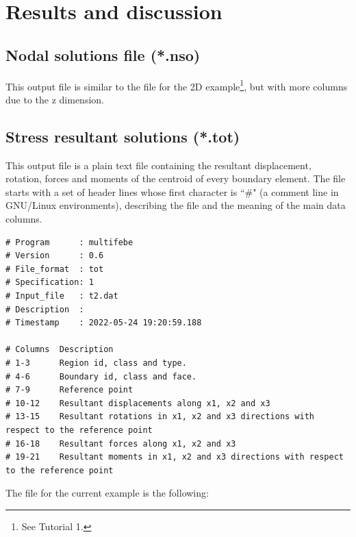 \documentclass[a4]{article}
\begin{document}
\section{Results and discussion}

\subsection{Nodal solutions file (*.nso)}

This output file is similar to the file for the 2D example\footnote{See Tutorial 1.}, but with more columns due to the z dimension. 

\subsection{Stress resultant solutions (*.tot)}

This output file is a plain text file containing the resultant  displacement, rotation, forces and moments of the centroid of every boundary element. The file starts with a set of header lines whose first character is ``$\#$" (a comment line in GNU/Linux environments), describing the file and the meaning of the main data columns. 

\begin{Verbatim}
# Program      : multifebe
# Version      : 0.6
# File_format  : tot
# Specification: 1
# Input_file   : t2.dat
# Description  : 
# Timestamp    : 2022-05-24 19:20:59.188

# Columns  Description
# 1-3      Region id, class and type.
# 4-6      Boundary id, class and face.
# 7-9      Reference point
# 10-12    Resultant displacements along x1, x2 and x3
# 13-15    Resultant rotations in x1, x2 and x3 directions with respect to the reference point
# 16-18    Resultant forces along x1, x2 and x3
# 19-21    Resultant moments in x1, x2 and x3 directions with respect to the reference point
\end{Verbatim}

The file for the current example is the following:
\end{document}

